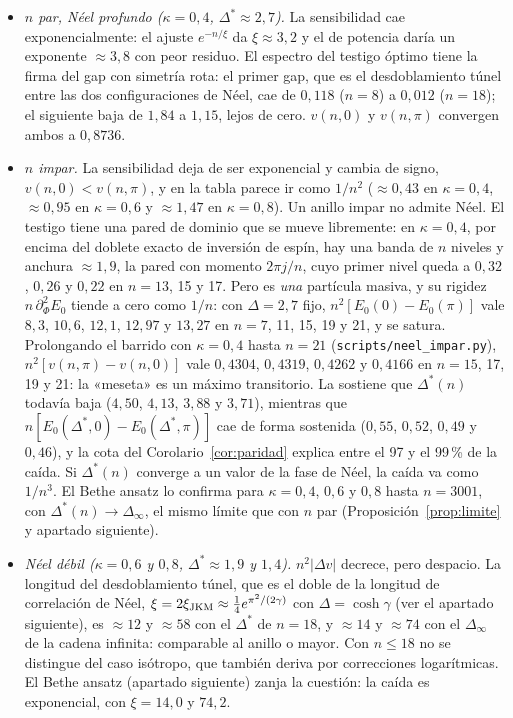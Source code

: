 \documentclass[11pt,a4paper]{article}
\theoremstyle{remark}
\begin{document}
\begin{itemize}
\item \emph{$n$ par, Néel profundo ($\kappa=0{,}4$, $\Delta^*\approx2{,}7$).} La sensibilidad cae
  exponencialmente: el ajuste $e^{-n/\xi}$ da $\xi\approx3{,}2$ y el de potencia daría un
  exponente $\approx3{,}8$ con peor residuo. El espectro del testigo óptimo tiene la firma del gap
  con simetría rota: el primer gap, que es el desdoblamiento túnel entre las dos configuraciones
  de Néel, cae de $0{,}118$ ($n=8$) a $0{,}012$ ($n=18$); el siguiente baja de $1{,}84$ a $1{,}15$,
  lejos de cero. $v(n,0)$ y $v(n,\pi)$ convergen ambos a $0{,}8736$.
\item \emph{$n$ impar.} La sensibilidad deja de ser exponencial y cambia de signo,
  $v(n,0)<v(n,\pi)$, y en la tabla parece ir como $1/n^2$ ($\approx0{,}43$ en $\kappa=0{,}4$,
  $\approx0{,}95$ en $\kappa=0{,}6$ y $\approx1{,}47$ en $\kappa=0{,}8$). Un anillo impar no admite
  Néel. El testigo tiene una pared de dominio que se mueve libremente: en $\kappa=0{,}4$, por encima
  del doblete exacto de inversión de espín, hay una banda de $n$ niveles y anchura $\approx1{,}9$,
  la pared con momento $2\pi j/n$, cuyo primer nivel queda a $0{,}32$, $0{,}26$ y $0{,}22$ en $n=13$,
  15 y 17. Pero es \emph{una} partícula masiva, y su rigidez $n\,\partial_\Phi^2E_0$ tiende a cero
  como $1/n$: con $\Delta=2{,}7$ fijo, $n^2[E_0(0)-E_0(\pi)]$ vale $8{,}3$, $10{,}6$, $12{,}1$,
  $12{,}97$ y $13{,}27$ en $n=7$, 11, 15, 19 y 21, y se satura. Prolongando el barrido con
  $\kappa=0{,}4$ hasta $n=21$ (\texttt{scripts/neel\_impar.py}), $n^2[v(n,\pi)-v(n,0)]$ vale
  $0{,}4304$, $0{,}4319$, $0{,}4262$ y $0{,}4166$ en $n=15$, 17, 19 y 21: la «meseta» es un máximo
  transitorio. La sostiene que $\Delta^\ast(n)$ todavía baja ($4{,}50$, $4{,}13$, $3{,}88$ y
  $3{,}71$), mientras que $n[E_0(\Delta^\ast,0)-E_0(\Delta^\ast,\pi)]$ cae de forma sostenida
  ($0{,}55$, $0{,}52$, $0{,}49$ y $0{,}46$), y la cota del Corolario~\ref{cor:paridad} explica entre
  el 97 y el 99\,\% de la caída. Si $\Delta^\ast(n)$ converge a un valor de la fase de Néel, la
  caída va como $1/n^3$. El Bethe ansatz lo confirma para $\kappa=0{,}4$, $0{,}6$ y $0{,}8$
  hasta $n=3001$, con $\Delta^\ast(n)\to\Delta_\infty$, el mismo límite que con $n$ par
  (Proposición~\ref{prop:limite} y apartado siguiente).
\item \emph{Néel débil ($\kappa=0{,}6$ y $0{,}8$, $\Delta^*\approx1{,}9$ y $1{,}4$).} $n^2|\Delta v|$
  decrece, pero despacio. La longitud del desdoblamiento túnel, que es el doble de la longitud de
  correlación de Néel, $\xi=2\xi_{\rm JKM}\approx\tfrac14e^{\pi^2/(2\gamma)}$ con $\Delta=\cosh\gamma$
  (ver el apartado siguiente), es $\approx12$ y $\approx58$ con el
  $\Delta^\ast$ de $n=18$, y $\approx14$ y $\approx74$ con el $\Delta_\infty$ de la cadena infinita:
  comparable al anillo o mayor. Con $n\le18$ no se distingue del caso isótropo, que también deriva
  por correcciones logarítmicas. El Bethe ansatz (apartado siguiente) zanja la cuestión: la caída
  es exponencial, con $\xi=14{,}0$ y $74{,}2$.
\end{itemize}
\end{document}
